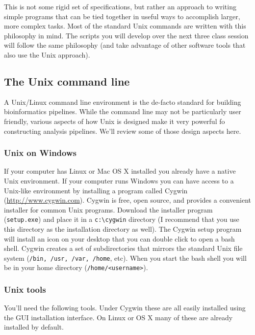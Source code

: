 This is not some rigid set of specifications, but rather an approach to writing simple programs that can be tied together in useful ways to accomplish larger, more complex tasks. Most of the standard Unix commands are written with this philosophy in mind. The scripts you will develop over the next three class session will follow the same philosophy (and take advantage of other software tools that also use the Unix approach).

\subsection{The Unix command line}

A Unix/Linux command line environment is the de-facto standard for building bioinformatics pipelines. While the command line may not be particularly user friendly, various aspects of how Unix is designed make it very powerful fo constructing analysis pipelines.  We'll review some of those design aspects here.


\subsubsection{Unix on Windows}

If your computer has Linux or Mac OS X installed you already have a native Unix environment.  If your computer runs Windows you can have access to a Unix-like environment by installing a program called Cygwin (\href{http://www.cygwin.com}{http://www.cygwin.com}).  Cygwin is free, open source, and provides a convenient installer for common Unix programs.  Download the installer program (\verb=setup.exe=) and place it in a \verb=c:\cygwin= directory (I recommend that you use this directory as the installation directory as well).  The Cygwin setup program will install an icon on your desktop that you can double click to open a bash shell. Cygwin creates a set of subdirectories that mirrors the standard Unix file system (\verb=/bin, /usr, /var, /home=, etc). When you start the bash shell you will be in your home directory (\verb=/home/<username>=).

\subsubsection{Unix tools}

You'll need the following tools. Under Cygwin these are all easily installed using the GUI installation interface. On Linux or OS X many of these are already installed by default.

